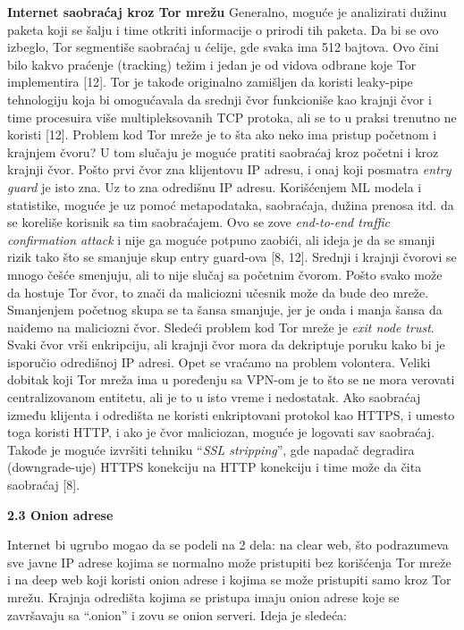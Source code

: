 \documentclass[
]{article}
\begin{document}
\textbf{Internet saobraćaj kroz Tor mrežu} Generalno, moguće je
analizirati dužinu paketa koji se šalju i time otkriti informacije o
prirodi tih paketa. Da bi se ovo izbeglo, Tor segmentiše saobraćaj u
ćelije, gde svaka ima 512 bajtova. Ovo čini bilo kakvo praćenje
(tracking) težim i jedan je od vidova odbrane koje Tor implementira
{[}12{]}. Tor je takođe originalno zamišljen da koristi leaky-pipe
tehnologiju koja bi omogućavala da srednji čvor funkcioniše kao krajnji
čvor i time procesuira više multipleksovanih TCP protoka, ali se to u
praksi trenutno ne koristi {[}12{]}. Problem kod Tor mreže je to šta ako
neko ima pristup početnom i krajnjem čvoru? U tom slučaju je moguće
pratiti saobraćaj kroz početni i kroz krajnji čvor. Pošto prvi čvor zna
klijentovu IP adresu, i onaj koji posmatra \emph{entry guard} je isto
zna. Uz to zna odredišnu IP adresu. Korišćenjem ML modela i statistike,
moguće je uz pomoć metapodataka, saobraćaja, dužina prenosa itd. da se
koreliše korisnik sa tim saobraćajem. Ovo se zove \emph{end-to-end
traffic confirmation attack} i nije ga moguće potpuno zaobići, ali ideja
je da se smanji rizik tako što se smanjuje skup entry guard-ova {[}8,
12{]}. Srednji i krajnji čvorovi se mnogo češće smenjuju, ali to nije
slučaj sa početnim čvorom. Pošto svako može da hostuje Tor čvor, to
znači da maliciozni učesnik može da bude deo mreže. Smanjenjem početnog
skupa se ta šansa smanjuje, jer je onda i manja šansa da naiđemo na
maliciozni čvor. Sledeći problem kod Tor mreže je \emph{exit node
trust}. Svaki čvor vrši enkripciju, ali krajnji čvor mora da dekriptuje
poruku kako bi je isporučio odredišnoj IP adresi. Opet se vraćamo na
problem volontera. Veliki dobitak koji Tor mreža ima u poređenju sa
VPN-om je to što se ne mora verovati centralizovanom entitetu, ali je to
u isto vreme i nedostatak. Ako saobraćaj između klijenta i odredišta ne
koristi enkriptovani protokol kao HTTPS, i umesto toga koristi HTTP, i
ako je čvor maliciozan, moguće je logovati sav saobraćaj. Takođe je
moguće izvršiti tehniku ``\emph{SSL stripping}'', gde napadač degradira
(downgrade-uje) HTTPS konekciju na HTTP konekciju i time može da čita
saobraćaj {[}8{]}.

\protect\hypertarget{_Toc234141042}{}{}\textbf{2.3 Onion adrese}

Internet bi ugrubo mogao da se podeli na 2 dela: na clear web, što
podrazumeva sve javne IP adrese kojima se normalno može pristupiti bez
korišćenja Tor mreže i na deep web koji koristi onion adrese i kojima se
može pristupiti samo kroz Tor mrežu. Krajnja odredišta kojima se
pristupa imaju onion adrese koje se završavaju sa ``.onion'' i zovu se
onion serveri. Ideja je sledeća:
\end{document}
